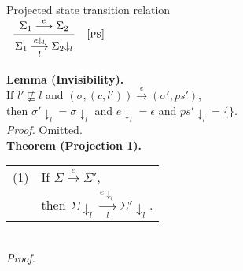 \documentclass{article}
\makeatletter
\newcommand{\startrules}{\begin{array}{l@{~{,}~}lcl@{~{,}~}l|ll}}
\newcommand{\finishrules}{\end{array}}
\newcommand{\rn}[1]{\text{\textsc{[#1]}}}
\newcommand{\mrule}[3]{%
      \multicolumn{6}{c}{
        \dfrac{
          \begin{array}{c}
            #2
          \end{array}
        }{#3}
      }
    &
      \rn{#1}
  \\
      \multicolumn{7}{c}{}
  \\%
}
\newcommand{\tsteparrow}[1]{\overset{#1}{\longrightarrow}}
\newcommand{\tstep}[3]{#2\tsteparrow{#1}#3}
\newcommand{\ssteparrow}[1]{\overset{#1}{\longrightarrow}}
\newcommand{\sstep}[3]{#2\ssteparrow{#1}#3}
\newcommand{\lssteparrow}[2]{\overset{#2}{\underset{#1}{\longrightarrow}}}
\newcommand{\lsstep}[4]{#3\lssteparrow{#1}{#2}#4}
\newcommand{\process}[2]{(#1,#2)}
\newcommand{\proj}[2]{#1{\downarrow_{#2}}}
\makeatother
\begin{document}
\newpage
\noindent
%
%
\fbox{$\lsstep{l}{e}{\Sigma}{\Sigma}$} Projected state transition relation
\\
$\startrules
  \mrule{ps}{
      \sstep{e}{\Sigma_1}{\Sigma_2}
  }{
    \lsstep{l}{\proj{e}{l}}{\Sigma_1}{\proj{\Sigma_2}{l}}
  }
\finishrules$
\\
\textbf{Lemma (Invisibility).}
\\
If $l'\not\sqsubseteq l$
and $\tstep{e}{(\sigma,\process{c}{l'})}{(\sigma',ps')}$,
\\
then $\proj{\sigma'}{l}=\proj{\sigma}{l}$
and $\proj{e}{l}=\epsilon$
and $\proj{ps'}{l}=\{\}$.
\\
\textit{Proof.}
Omitted.
\\
\textbf{Theorem (Projection 1).}
\\
\begin{tabular}{l@{$\qquad$}l}
  (1) & If $\sstep{e}{\Sigma}{\Sigma'}$,
\\
      & then $\lsstep{l}{\proj{e}{l}}{\proj{\Sigma}{l}}{\proj{\Sigma'}{l}}$.
\end{tabular}
\\
\textit{Proof.}
\\
\newcommand{\z}{$\quad$}
\end{document}
